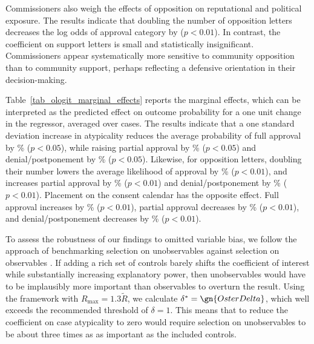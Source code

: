 Commissioners also weigh the effects of opposition on reputational and political exposure. The results indicate that doubling the number of opposition letters decreases the log odds of approval category by  ($p<0.01$). In contrast, the coefficient on support letters is small and statistically insignificant. Commissioners appear systematically more sensitive to community opposition than to community support, perhaps reflecting a defensive orientation in their decision-making.

Table~\ref{tab_ologit_marginal_effects} reports the marginal effects, which can be interpreted as the predicted effect on outcome probability for a one unit change in the regressor, averaged over cases. 
The results indicate that a one standard deviation increase in atypicality reduces the average probability of full approval by \% ($p<0.05$), while raising partial approval by \% ($p<0.05$) and denial/postponement by \% ($p<0.05$). Likewise, for opposition letters, doubling their number lowers the average likelihood of approval by \% ($p<0.01$), and increases partial approval by \% ($p<0.01$) and denial/postponement by \% ($p<0.01$). Placement on the consent calendar has the opposite effect. Full approval increases by \% ($p<0.01$), partial approval decreases by \% ($p<0.01$), and denial/postponement decreases by \% ($p<0.01$).

To assess the robustness of our findings to omitted variable bias, we follow the approach of benchmarking selection on unobservables against selection on observables \citep{AltonjiElderTaber2005, Oster2019}. If adding a rich set of controls barely shifts the coefficient of interest while substantially increasing explanatory power, then unobservables would have to be implausibly more important than observables to overturn the result. Using the \citet{Oster2019} framework with $R_{\text{max}} = 1.3 \tilde{R}$, we calculate $\delta^\ast = \gn{OsterDelta}$, which well exceeds the recommended threshold of $\delta=1$. This means that to reduce the coefficient on case atypicality to zero would require selection on unobservables to be about three times as as important as the included controls.


